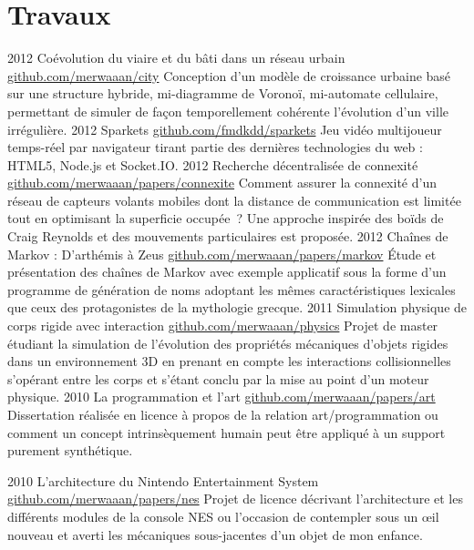 \documentclass[]{friggeri-cv}
\begin{document}
\section{Travaux}

\begin{entrylist}
  \entry
    {2012}
    {Coévolution du viaire et du bâti dans un réseau urbain}
    {\href{http://github.com/merwaaan/city}{github.com/merwaaan/city}}
    {Conception d'un modèle de croissance urbaine basé sur une structure
      hybride, mi-diagramme de Voronoï, mi-automate cellulaire, permettant
      de simuler de façon temporellement cohérente l'évolution d'un ville 
      irrégulière.}
  \entry
    {2012}
    {Sparkets}
    {\href{http://github.com/fmdkdd/sparkets}{github.com/fmdkdd/sparkets}}
    {Jeu vidéo multijoueur temps-réel par navigateur tirant partie des
      dernières technologies du web : HTML5, Node.js et Socket.IO.}
  \entry
    {2012}
    {Recherche décentralisée de connexité}
    {\href{https://github.com/merwaaan/papers/blob/master/connexite/rapport.pdf?raw=true}{github.com/merwaaan/papers/connexite}}
    {Comment assurer la connexité d'un réseau de capteurs volants
      mobiles dont la distance de communication est limitée tout en
      optimisant la superficie occupée~? Une approche inspirée des
      boïds de Craig Reynolds et des mouvements particulaires est
      proposée.}
  \entry
    {2012}
    {Chaînes de Markov : D'arthémis à Zeus}
    {\href{https://github.com/merwaaan/papers/blob/master/markov/rapport.pdf?raw=true}{github.com/merwaaan/papers/markov}}
    {\'Etude et présentation des chaînes de Markov avec exemple
      applicatif sous la forme d'un programme de génération de noms
      adoptant les mêmes caractéristiques lexicales que ceux des
      protagonistes de la mythologie grecque.}
  \entry
    {2011}
    {Simulation physique de corps rigide avec interaction}
    {\href{http://github.com/merwaaan/physics}{github.com/merwaaan/physics}}
    {Projet de master étudiant la simulation de l'évolution des
      propriétés mécaniques d'objets rigides dans un environnement 3D
      en prenant en compte les interactions collisionnelles s'opérant
      entre les corps et s'étant conclu par la mise au point d'un
      moteur physique.}
  \entry
    {2010}
    {La programmation et l'art}
    {\href{http://github.com/merwaaan/papers/blob/master/art/progart.pdf?raw=true}{github.com/merwaaan/papers/art}}
    {Dissertation réalisée en licence à propos de la relation
      art/programmation ou comment un concept intrinsèquement humain
      peut être appliqué à un support purement synthétique.}

  \entry
    {2010}
    {L'architecture du Nintendo Entertainment System}
    {\href{https://github.com/merwaaan/papers/blob/master/nes/archines.pdf?raw=true}{github.com/merwaaan/papers/nes}}
    {Projet de licence décrivant l'architecture et les différents
      modules de la console NES ou l'occasion de contempler sous un
      \oe il nouveau et averti les mécaniques sous-jacentes d'un objet
      de mon enfance.}

\end{entrylist}
\end{document}
